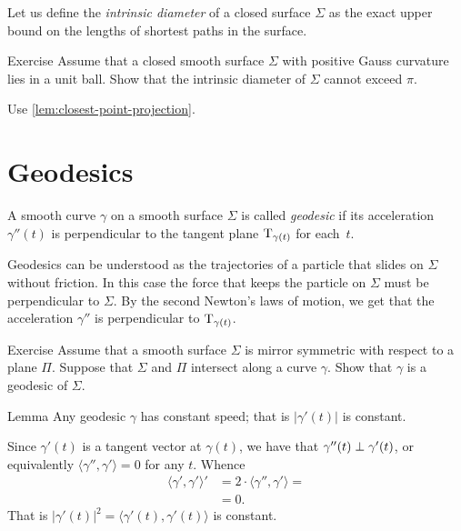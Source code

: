 Let us define the \emph{intrinsic diameter} of a closed surface $\Sigma$ as the exact upper bound on the lengths of shortest paths in the surface.

\begin{thm}{Exercise}\label{ex:intrinsic-diameter}
Assume that a closed smooth surface $\Sigma$ with positive Gauss curvature lies in a unit ball.
Show that the intrinsic diameter of $\Sigma$ cannot exceed $\pi$.
\end{thm}

 Use \ref{lem:closest-point-projection}.


\section*{Geodesics}

A smooth curve $\gamma$ on a smooth surface $\Sigma$ is called \emph{geodesic} if its acceleration $\gamma''(t)$ is perpendicular to the tangent plane $\mathrm{T}_{\gamma(t)}$ for each~$t$.

Geodesics can be understood as the trajectories of a particle that slides on $\Sigma$ without friction.
In this case the force that keeps the particle on $\Sigma$ must be perpendicular to $\Sigma$.
By the second Newton's laws of motion,
we get that the acceleration $\gamma''$ is perpendicular to $\mathrm{T}_{\gamma(t)}$.

\begin{thm}{Exercise}\label{ex:reflection-geodesic}
Assume that a smooth surface $\Sigma$ is mirror symmetric with respect to  a plane $\Pi$.
Suppose that $\Sigma$ and $\Pi$ intersect along a curve $\gamma$.
Show that $\gamma$ is a geodesic of $\Sigma$.
\end{thm}

\begin{thm}{Lemma}\label{lem:constant-speed}
Any geodesic $\gamma$ has constant speed; that is $|\gamma'(t)|$ is constant.
\end{thm}

Since $\gamma'(t)$ is a tangent vector at $\gamma(t)$,
we have that $\gamma''(t)\z\perp\gamma'(t)$, or equivalently $\langle\gamma'',\gamma'\rangle=0$ for any $t$.
Whence 
\begin{align*}
\langle\gamma',\gamma'\rangle'&=2\cdot \langle\gamma'',\gamma'\rangle=
\\
&=0.
\end{align*}
That is $|\gamma'(t)|^2=\langle\gamma'(t),\gamma'(t)\rangle$ is constant.
\qeds

